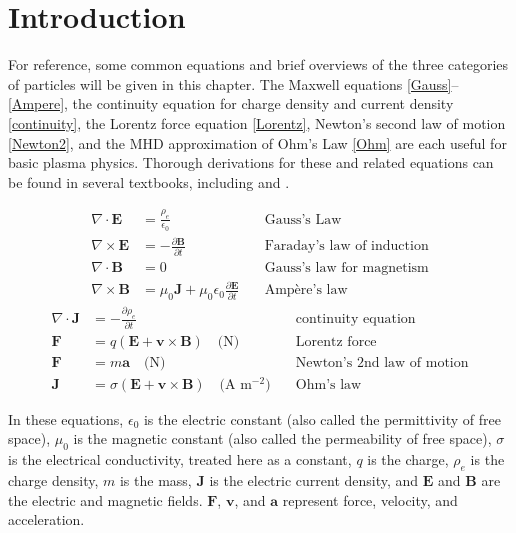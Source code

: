 \section{Introduction}
\label{Transport Intro}
For reference, some common equations and brief overviews of the three categories of particles will be given in this chapter. The Maxwell equations \eqref{Gauss}--\!\,\eqref{Ampere}, the continuity equation for charge density and current density \eqref{continuity}, the Lorentz force equation \eqref{Lorentz}, Newton's second law of motion \eqref{Newton2}, and the \ac{MHD} approximation of Ohm's Law \eqref{Ohm} are each useful for basic plasma physics. Thorough derivations for these and related equations can be found in several textbooks, including \citet{gombosi98} and \citet{jackson99}.

\begin{subequations}
 \begin{align}
  \nabla\cdot\mathbf{E}&=\frac{\rho_e}{\epsilon_0}&\quad\text{Gauss's Law}
  \label{Gauss}\\
  \nabla\times\mathbf{E}&=-\frac{\partial\mathbf{B}}{\partial t}&\quad\text{Faraday's law of induction}
  \label{Faraday}\\
  \nabla\cdot\mathbf{B}&=0&\quad\text{Gauss's law for magnetism}
  \label{Gauss m}\\
  \nabla\times\mathbf{B}&=\mu_0\mathbf{J}+\mu_0\epsilon_0\frac{\partial\mathbf{E}}{\partial t}&\quad\text{Amp\`{e}re's law}
  \label{Ampere}
 \end{align}
\end{subequations}
\begin{align}
 \nabla\cdot\mathbf{J}&=-\frac{\partial\rho_e}{\partial t}&\quad\text{continuity equation}
 \label{continuity}\\
 \mathbf{F}&=q\left(\mathbf{E}+\mathbf{v}\times\mathbf{B}\right)\quad\text{(N)}&\quad\text{Lorentz force}
 \label{Lorentz}\\
 \mathbf{F}&=m\mathbf{a}\quad\text{(N)}&\quad\text{Newton's 2nd law of motion}
 \label{Newton2}\\
 \mathbf{J}&=\sigma\left(\mathbf{E+v\times B}\right)\quad\text{(A m$^{-2}$)}&\quad\text{Ohm's law}
 \label{Ohm}
\end{align}

In these equations, $\epsilon_0$ is the electric constant (also called the permittivity of free space), $\mu_0$ is the magnetic constant (also called the permeability of free space), $\sigma$ is the electrical conductivity, treated here as a constant, $q$ is the charge, $\rho_e$ is the charge density, $m$ is the mass, $\mathbf{J}$ is the electric current density, and $\mathbf{E}$ and $\mathbf{B}$ are the electric and magnetic fields. $\mathbf{F}$, $\mathbf{v}$, and $\mathbf{a}$ represent force, velocity, and acceleration. 

